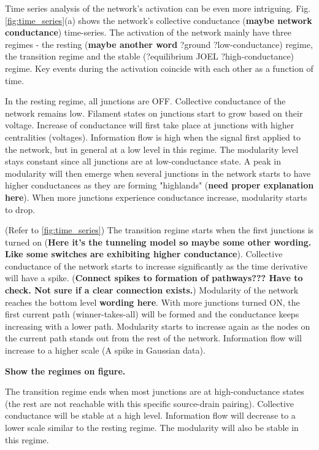 \documentclass[fleqn,10pt,  amsmath,amssymb,aps]{wlscirep}
\begin{document}
Time series analysis of the network's activation can be even more intriguing. Fig. \ref{fig:time_series}(a) shows the network's collective conductance (\textbf{maybe network conductance}) time-series. The activation of the network mainly have three regimes - the resting (\textbf{maybe another word} ?ground ?low-conductance) regime, the transition regime and the stable (?equilibrium JOEL ?high-conductance) regime. Key events during the activation coincide with each other as a function of time. 

In the resting regime, all junctions are OFF. Collective conductance of the network remains low. Filament states on junctions start to grow based on their voltage. Increase of conductance will first take place at junctions with higher centralities (voltages). Information flow is high when the signal first applied to the network, but in general at a low level in this regime. The modularity level stays constant since all junctions are at low-conductance state. A peak in modularity will then emerge when several junctions in the network starts to have higher conductances as they are forming "highlands" (\textbf{need proper explanation here}). When more junctions experience conductance increase, modularity starts to drop.

(Refer to \ref{fig:time_series}) The transition regime starts when the first junctions is turned on (\textbf{Here it's the tunneling model so maybe some other wording. Like some switches are exhibiting higher conductance}). Collective conductance of the network starts to increase significantly as the time derivative will have a spike. (\textbf{Connect spikes to formation of pathways??? Have to check. Not sure if a clear connection exists.}) Modularity of the network reaches the bottom level \textbf{wording here}. With more junctions turned ON, the first current path (winner-takes-all) will be formed and the conductance keeps increasing with a lower path. Modularity starts to increase again as the nodes on the current path stands out from the rest of the network. Information flow will increase to a higher scale (A spike in Gaussian data). 

\textbf{Show the regimes on figure.}

The transition regime ends when most junctions are at high-conductance states (the rest are not reachable with this specific source-drain pairing). Collective conductance will be stable at a high level. Information flow will decrease to a lower scale similar to the resting regime. The modularity will also be stable in this regime.
\end{document}
